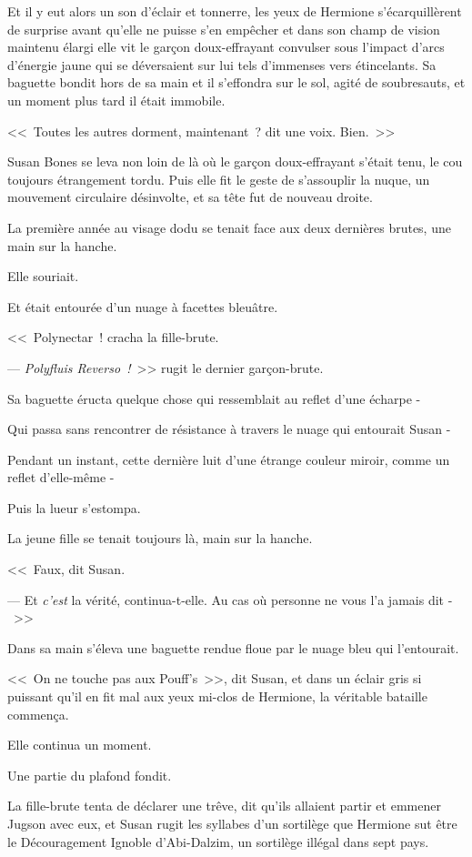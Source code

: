 Et il y eut alors un son d'éclair et tonnerre, les yeux de Hermione s'écarquillèrent de surprise avant qu'elle ne puisse s'en empêcher et dans son champ de vision maintenu élargi elle vit le garçon doux-effrayant convulser sous l'impact d'arcs d'énergie jaune qui se déversaient sur lui tels d'immenses vers étincelants. Sa baguette bondit hors de sa main et il s'effondra sur le sol, agité de soubresauts, et un moment plus tard il était immobile.

<<~Toutes les autres dorment, maintenant~? dit une voix. Bien.~>>

Susan Bones se leva non loin de là où le garçon doux-effrayant s'était tenu, le cou toujours étrangement tordu. Puis elle fit le geste de s'assouplir la nuque, un mouvement circulaire désinvolte, et sa tête fut de nouveau droite.

La première année au visage dodu se tenait face aux deux dernières brutes, une main sur la hanche.

Elle souriait.

Et était entourée d'un nuage à facettes bleuâtre.

<<~Polynectar~! cracha la fille-brute.

--- \emph{Polyfluis Reverso~!}~>> rugit le dernier garçon-brute.

Sa baguette éructa quelque chose qui ressemblait au reflet d'une écharpe -

Qui passa sans rencontrer de résistance à travers le nuage qui entourait Susan -

Pendant un instant, cette dernière luit d'une étrange couleur miroir, comme un reflet d'elle-même -

Puis la lueur s'estompa.

La jeune fille se tenait toujours là, main sur la hanche.

<<~Faux, dit Susan.

--- Et \emph{c'est} la vérité, continua-t-elle. Au cas où personne ne vous l'a jamais dit -~>>

Dans sa main s'éleva une baguette rendue floue par le nuage bleu qui l'entourait.

<<~On ne touche pas aux Pouff's~>>, dit Susan, et dans un éclair gris si puissant qu'il en fit mal aux yeux mi-clos de Hermione, la véritable bataille commença.

Elle continua un moment.

Une partie du plafond fondit.

La fille-brute tenta de déclarer une trêve, dit qu'ils allaient partir et emmener Jugson avec eux, et Susan rugit les syllabes d'un sortilège que Hermione sut être le Découragement Ignoble d'Abi-Dalzim, un sortilège illégal dans sept pays.

